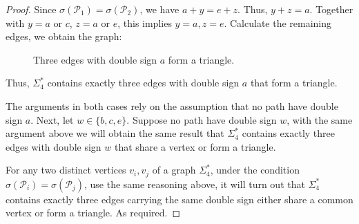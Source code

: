 \documentclass[12pt]{amsart}
\theoremstyle{plain}
\theoremstyle{definition}%
\begin{document}
\begin{proof}
Since $\sigma(\mathscr{P}_1)=\sigma(\mathscr{P}_2)$, we have $a+y=e+z$. Thus, $y+z=a$. Together with $y=a$ or $c$, $z=a$ or $e$, this implies $y=a,z=e$.  Calculate the remaining edges, we obtain the graph: 

\vspace{1cm}
\begin{figure}[h]
    \centering
{}
\caption{Three edges with double sign $a$ form a triangle.}
    \label{three a}
\end{figure}
\vspace{1cm}



Thus, $\Sigma_4^*$ contains exactly three edges with double sign 
$a$ that  form a triangle.  

The arguments in both cases rely on the assumption that no path have double sign $a$. Next, let $w\in\{b,c,e\}$. Suppose no path have double sign $w$, with the same argument above we will obtain the same result that $\Sigma_4^*$ contains exactly three edges with double sign 
$w$ that share a vertex or form a triangle. 

For any two distinct vertices $v_i,v_j$ of a graph $\Sigma_4^*$, under the condition $\sigma(\mathscr{P}_i)=\sigma(\mathscr{P}_j)$,  use the same reasoning above, it will turn out that  $\Sigma_4^*$ contains exactly three edges carrying the same double sign either share a common vertex or form a triangle. As required.


\end{proof}
\end{document}
